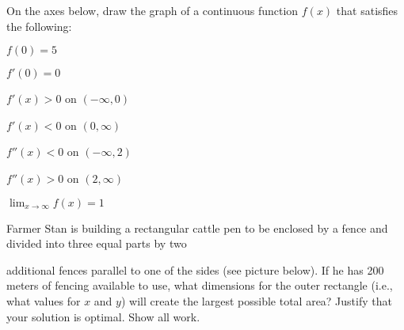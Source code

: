 \documentclass[addpoints,12pt]{exam}
\newcommand{\ds}{\displaystyle}
\begin{document}
\begin{questions}

\newpage


\question[10] On the axes below,
draw the graph of a continuous function $f(x)$ that satisfies the following:\smallskip

      $f(0)=5$\smallskip

      $f'(0)=0$ \smallskip

      $f'(x)>0$ on $(-\infty, 0)$\smallskip

      $f'(x)<0$ on $(0,\infty)$\smallskip


      $f''(x)<0$ on $(-\infty, 2)$ \smallskip

      $f''(x)>0$ on $(2,\infty)$\smallskip

$\ds\lim_{x\to\infty}f(x)=1$





\newpage

\question[12]
       Farmer Stan is building a rectangular cattle pen to be enclosed by a fence and divided
into three equal parts by two

      additional fences parallel to one of the sides (see picture below). If he has 200 meters of
fencing available to use, what dimensions for the outer rectangle (i.e., what values for $x$ and
$y$) will create the largest possible total area? Justify that your solution is optimal. Show all
work.

\bigskip

       \begin{figure}[h]
              \begin{center}
\end{center}
\end{figure}
\end{questions}
\end{document}
